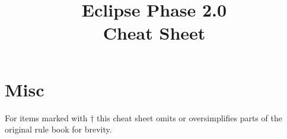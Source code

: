 \documentclass{article}
\title{Eclipse Phase 2.0\\\small{Cheat Sheet}}
\begin{document}
\maketitle











\section*{Misc}

For items marked with $\dagger$ this cheat sheet omits or
oversimplifies parts of the original rule book for brevity.
\end{document}
